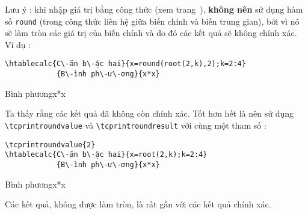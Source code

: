 \documentclass[a4paper,10pt]{article}
\newcommand\verbinline{\lstinline[breaklines=false,basicstyle=\normalsize\ttfamily]}
\newcommand\mywidth{0.85\linewidth}
\begin{document}
Lưu ý : khi nhập giá trị bằng công thức (xem trang~\pageref{nhapbangcongthuc}), \textbf{không nên} sử dụng hàm số \verb|round| (trong công thức liên hệ giữa biến chính và biến trung gian), bởi vì nó sẽ làm tròn các giá trị của biến chính và do đó các kết quả sẽ không chính xác. Ví dụ :
\begin{center}
\begin{minipage}{0.75\linewidth}
\begin{lstlisting}
\htablecalc{C\-ăn b\-ậc hai}{x=round(root(2,k),2);k=2:4}
            {B\-ình ph\-ư\-ơng}{x*x}
\end{lstlisting}
\end{minipage}

            {Bình phương}{x*x}
\end{center}
Ta thấy rằng các kết quả đã không còn chính xác. Tốt hơn hết là nên sử dụng \verbinline|\tcprintroundvalue| và \verbinline|\tcprintroundresult| với cùng một tham số :
\begin{center}
\begin{minipage}{\mywidth}
\begin{lstlisting}
\tcprintroundvalue{2}
\htablecalc{C\-ăn b\-ậc hai}{x=root(2,k);k=2:4}
            {B\-ình ph\-ư\-ơng}{x*x}
\end{lstlisting}
\end{minipage}

            {Bình phương}{x*x}
\end{center}
Các kết quả, không được làm tròn, là rất gần với các kết quả chính xác.
\end{document}
